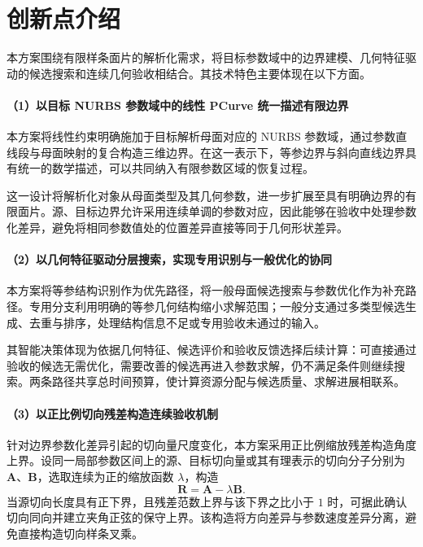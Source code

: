 \section{创新点介绍}
本方案围绕有限样条面片的解析化需求，将目标参数域中的边界建模、几何特征驱动的候选搜索和连续几何验收相结合。其技术特色主要体现在以下方面。

\paragraph{（1）以目标 NURBS 参数域中的线性 PCurve 统一描述有限边界}
本方案将线性约束明确施加于目标解析母面对应的 NURBS 参数域，通过参数直线段与母面映射的复合构造三维边界。在这一表示下，等参边界与斜向直线边界具有统一的数学描述，可以共同纳入有限参数区域的恢复过程。

这一设计将解析化对象从母面类型及其几何参数，进一步扩展至具有明确边界的有限面片。源、目标边界允许采用连续单调的参数对应，因此能够在验收中处理参数化差异，避免将相同参数值处的位置差异直接等同于几何形状差异。

\paragraph{（2）以几何特征驱动分层搜索，实现专用识别与一般优化的协同}
本方案将等参结构识别作为优先路径，将一般母面候选搜索与参数优化作为补充路径。专用分支利用明确的等参几何结构缩小求解范围；一般分支通过多类型候选生成、去重与排序，处理结构信息不足或专用验收未通过的输入。

其智能决策体现为依据几何特征、候选评价和验收反馈选择后续计算：可直接通过验收的候选无需优化，需要改善的候选再进入参数求解，仍不满足条件则继续搜索。两条路径共享总时间预算，使计算资源分配与候选质量、求解进展相联系。

\paragraph{（3）以正比例切向残差构造连续验收机制}
针对边界参数化差异引起的切向量尺度变化，本方案采用正比例缩放残差构造角度上界。设同一局部参数区间上的源、目标切向量或其有理表示的切向分子分别为 $\mathbf A$、$\mathbf B$，选取连续为正的缩放函数 $\lambda$，构造
\[\mathbf R=\mathbf A-\lambda\mathbf B.\]
当源切向长度具有正下界，且残差范数上界与该下界之比小于 $1$ 时，可据此确认切向同向并建立夹角正弦的保守上界。该构造将方向差异与参数速度差异分离，避免直接构造切向样条叉乘。

